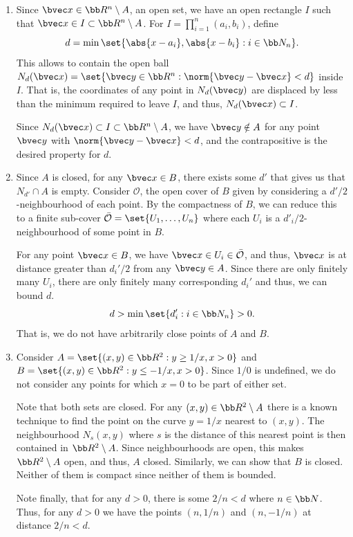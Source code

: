 \documentclass[12pt, letterpaper]{hmcpset}
\begin{document}
\begin{solution}
	\begin{enumerate}
		\item Since $\bvec x \in \bb R^n \setminus A$, an open set, we have an open rectangle $I$ such that $\bvec x \in I \subset \bb R^n \setminus A$. For $I = \prod_{i = 1}^n (a_i, b_i)$, define
			\[
				d = \min \set{\abs{x - a_i}, \abs{x - b_i} : i \in \bb N_n}.
			\]
			This allows to contain the open ball $N_d(\bvec x) = \set{\bvec y \in \bb R^n : \norm{\bvec y - \bvec x} < d}$ inside $I$. That is, the coordinates of any point in $N_d(\bvec y)$ are displaced by less than the minimum required to leave $I$, and thus, $N_d(\bvec x) \subset I$.

			Since $N_d(\bvec x) \subset I \subset \bb R^n \setminus A$, we have $\bvec y \notin A$ for any point $\bvec y$ with $\norm{\bvec y - \bvec x} < d$, and the contrapositive is the desired property for $d$.
		\item Since $A$ is closed, for any $\bvec x \in B$, there exists some $d'$ that gives us that $N_{d'} \cap A$ is empty. Consider $\mathcal O$, the open cover of $B$ given by considering a $d'/2$-neighbourhood of each point. By the compactness of $B$, we can reduce this to a finite sub-cover $\bar{\mathcal O} = \set{U_1, \ldots, U_n}$ where each $U_i$ is a $d'_i/2$-neighbourhood of some point in $B$.

			For any point $\bvec x \in B$, we have $\bvec x \in U_i \in \bar{\mathcal O}$, and thus, $\bvec x$ is at distance greater than $d_i'/2$ from any $\bvec y \in A$. Since there are only finitely many $U_i$, there are only finitely many corresponding $d_i'$ and thus, we can bound $d$.
			\[
				d > \min \set{d_i' : i \in \bb N_n} > 0.
			\]
			That is, we do not have arbitrarily close points of $A$ and $B$.
		\item Consider $A = \set{(x, y) \in \bb R^2 : y \ge 1/x, x > 0}$ and $B = \set{(x, y) \in \bb R^2 : y \le - 1/x, x > 0}$. Since $1/0$ is undefined, we do not consider any points for which $x = 0$ to be part of either set. 

			Note that both sets are closed. For any $(x, y) \in \bb R^2 \setminus A$ there is a known technique to find the point on the curve $y = 1/x$ nearest to $(x, y)$. The neighbourhood $N_s(x, y)$ where $s$ is the distance of this nearest point is then contained in $\bb R^2 \setminus A$. Since neighbourhoods are open, this makes $\bb R^2 \setminus A$ open, and thus, $A$ closed. Similarly, we can show that $B$ is closed. Neither of them is compact since neither of them is bounded. 

			Note finally, that for any $d > 0$, there is some $2/n < d$ where $n \in \bb N$. Thus, for any $d > 0$ we have the points $(n, 1/n)$ and $(n, -1/n)$ at distance $2/n < d$.
	\end{enumerate}
\end{solution}
\end{document}
